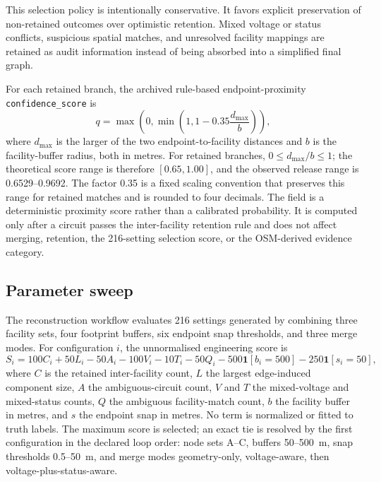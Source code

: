 \documentclass[10pt]{article}
\newcommand{\code}[1]{\texttt{#1}}
\begin{document}
This selection policy is intentionally conservative. It favors explicit preservation of non-retained outcomes over optimistic retention. Mixed voltage or status conflicts, suspicious spatial matches, and unresolved facility mappings are retained as audit information instead of being absorbed into a simplified final graph.

For each retained branch, the archived rule-based endpoint-proximity \code{confidence\_score} is
\begin{equation}
q=\max\!\left(0,\min\!\left(1,1-0.35\frac{d_{\max}}{b}\right)\right),
\end{equation}
where $d_{\max}$ is the larger of the two endpoint-to-facility distances and $b$ is the facility-buffer radius, both in metres. For retained branches, $0\leq d_{\max}/b\leq1$; the theoretical score range is therefore $[0.65,1.00]$, and the observed release range is 0.6529--0.9692. The factor 0.35 is a fixed scaling convention that preserves this range for retained matches and is rounded to four decimals. The field is a deterministic proximity score rather than a calibrated probability. It is computed only after a circuit passes the inter-facility retention rule and does not affect merging, retention, the 216-setting selection score, or the OSM-derived evidence category.

\subsection{Parameter sweep}

The reconstruction workflow evaluates 216 settings generated by combining three facility sets, four footprint buffers, six endpoint snap thresholds, and three merge modes. For configuration $i$, the unnormalised engineering score is
\begin{equation}
S_i=100C_i+50L_i-50A_i-100V_i-10T_i-50Q_i-500\mathbf{1}[b_i=500]-250\mathbf{1}[s_i=50],
\end{equation}
where $C$ is the retained inter-facility count, $L$ the largest edge-induced component size, $A$ the ambiguous-circuit count, $V$ and $T$ the mixed-voltage and mixed-status counts, $Q$ the ambiguous facility-match count, $b$ the facility buffer in metres, and $s$ the endpoint snap in metres. No term is normalized or fitted to truth labels. The maximum score is selected; an exact tie is resolved by the first configuration in the declared loop order: node sets A--C, buffers 50--500~m, snap thresholds 0.5--50~m, and merge modes geometry-only, voltage-aware, then voltage-plus-status-aware.
\end{document}
